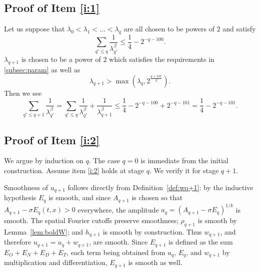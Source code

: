 \documentclass[12pt,reqno,letterpaper]{amsart}
\numberwithin{equation}{section}
\newcommand{\1}{{\bf 1}}
\newcommand{\2}{{\bf 2}}
\theoremstyle{remark}
\theoremstyle{remark}
\begin{document}
\subsection{Proof of Item \ref{i:1}}
Let us suppose that $\lambda_0 < \lambda_1 < \ldots < \lambda_q$ are all chosen to be powers of $2$ and satisfy
$$
\sum_{q' \leq q} \frac{1}{\lambda_{q'}^\beta} \leq \frac{1}{4} - 2^{-q-100}.
$$
$\lambda_{q+1}$ is chosen to be a power of $2$ which satisfies the requirements in \ref{subsec:param} as well as
\begin{equation*}
    \lambda_{q+1} > \max\left(\lambda_q,2^{\frac{q+101}{\beta}}\right).
\end{equation*}
Then we see
$$
\sum_{q' \leq q+1} \frac{1}{\lambda_{q'}^\beta} = \sum_{q'\leq q} \frac{1}{\lambda_{q'}^\beta} + \frac{1}{\lambda_{q+1}^\beta} \leq \frac{1}{4} - 2^{-q-100} + 2^{-q-101} = \frac{1}{4} - 2^{-q-101}.
$$








\subsection{Proof of Item \ref{i:2}}


We argue by induction on $q$. The case $q=0$ is immediate from the initial construction. Assume item \ref{i:2} holds at stage $q$. We verify it for stage $q+1$.

Smoothness of $u_{q+1}$ follows directly from Definition~\ref{def:wq+1}: by the inductive hypothesis $E_q$ is smooth, and since $A_{q+1}$ is chosen so that $A_{q+1}-\sigma E_q(t,x)>0$ everywhere, the amplitude $a_q=(A_{q+1}- \sigma E_q)^{1/k}$ is smooth. The spatial Fourier cutoffs preserve smoothness; $\rho_{q+1}$ is smooth by Lemma~\ref{lem:boldW}; and $h_{q+1}$ is smooth by construction. Thus $w_{q+1}$, and therefore $u_{q+1}=u_q+w_{q+1}$, are smooth. Since $E_{q+1}$ is defined as the sum $E_O+E_N+E_D+E_T$, each term being obtained from $u_q$, $E_q$, and $w_{q+1}$ by multiplication and differentiation, $E_{q+1}$ is smooth as well.
\end{document}

